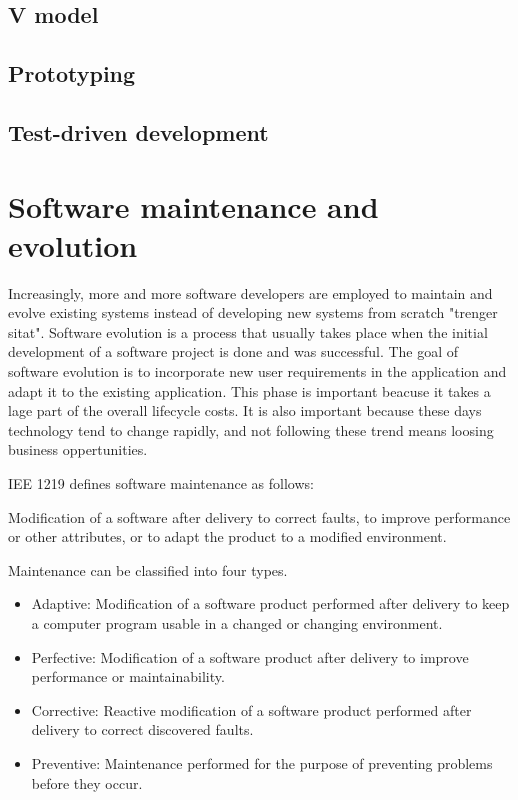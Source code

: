 \subsection{V model}

\subsection{Prototyping}

\subsection{Test-driven development}


\section{Software maintenance and evolution}
Increasingly, more and more software developers are employed to maintain and evolve existing systems instead of developing new systems from scratch "trenger sitat". Software evolution is a process that usually takes place when the initial development of a software project is done and was successful\cite{Bennett:2000:SME:336512.336534}. The goal of software evolution is to incorporate new user requirements in the application and adapt it to the existing application. This phase is important beacuse it takes a lage part of the overall lifecycle costs. It is also important because these days technology tend to change rapidly, and not following these trend means loosing business oppertunities.

IEE 1219 defines software maintenance as follows\cite{720567}:
\begin{displayquote}
Modification of a software after delivery to correct faults, to improve performance or other attributes, or to adapt the product to a modified environment.
\end{displayquote} 
Maintenance can be classified into four types\cite{Bennett:2000:SME:336512.336534,720567}.

\begin{itemize}
	\item Adaptive: Modification of a software product performed after delivery to keep a computer program usable in a changed or changing environment.
	\item Perfective: Modification of a software product after delivery to improve performance or maintainability.
	\item Corrective: Reactive modification of a software product performed after delivery to correct discovered faults.
	\item Preventive: Maintenance performed for the purpose of preventing problems before they occur.
\end{itemize}

